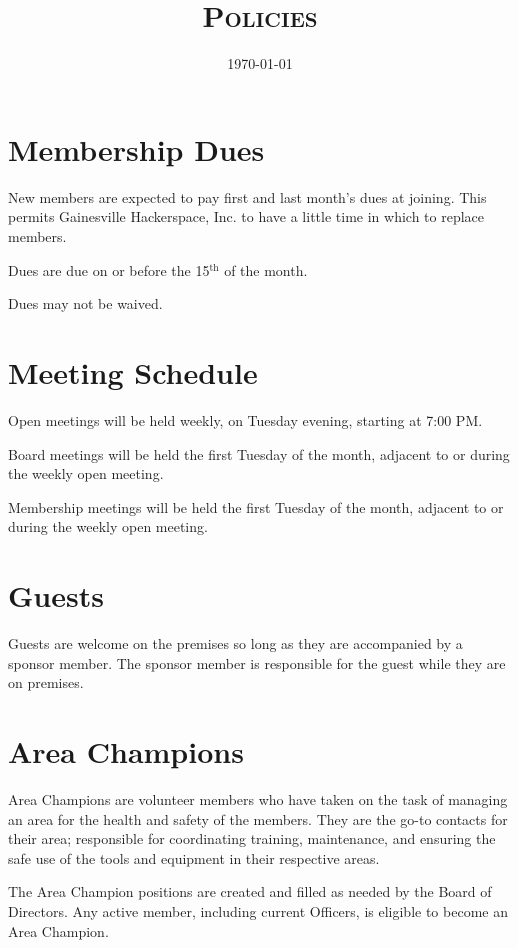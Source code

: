 \documentclass[10pt,letterpaper,titlepage]{article}
\title{%
    \textsc{\LARGE \corpname \\
    \Large Policies
    }
}
\date{\today}
\author{}
\newcommand\corpname{Gainesville Hackerspace, Inc.}
\newcommand{\superscript}[1]{\ensuremath{^{\textrm{#1}}}}
\renewcommand{\th}[0]{\superscript{th}}
\begin{document}
\maketitle

\tableofcontents
\newpage

\section{Membership Dues}
\label{dues}

New members are expected to pay first and last month's dues at joining. This
permits \corpname{} to have a little time in which to replace members.

Dues are due on or before the 15\th{} of the month.

Dues may not be waived.

\section{Meeting Schedule}

Open meetings will be held weekly, on Tuesday evening, starting at 7:00 PM.

Board meetings will be held the first Tuesday of the month, adjacent
to or during the weekly open meeting.

Membership meetings will be held the first Tuesday of the month,
adjacent to or during the weekly open meeting.

\section{Guests}
Guests are welcome on the premises so long as they are accompanied by a sponsor
member. The sponsor member is responsible for the guest while they are on
premises.

\section{Area Champions}
Area Champions are volunteer members who have taken on the task of managing an
area for the health and safety of the members. They are the go-to contacts for
their area; responsible for coordinating training, maintenance, and ensuring
the safe use of the tools and equipment in their respective areas.

The Area Champion positions are created and filled as needed by the Board of
Directors. Any active member, including current Officers, is eligible to become
an Area Champion.
\end{document}
